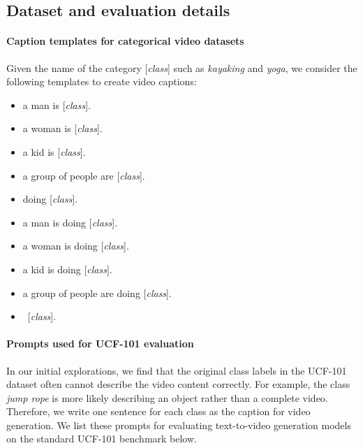 \documentclass[10pt,twocolumn,letterpaper]{article}
\begin{document}
\subsection{Dataset and evaluation details}
\label{sec:data_eval_details}

\paragraph{Caption templates for categorical video datasets} Given the name of the category [\textit{class}] such as \textit{kayaking} and \textit{yoga}, we consider the following templates to create video captions:

\begin{itemize}
    \item a man is [\textit{class}].
    \item a woman is [\textit{class}].
    \item a kid is [\textit{class}].
    \item a group of people are [\textit{class}].
    \item doing [\textit{class}].
    \item a man is doing [\textit{class}].
    \item a woman is doing [\textit{class}].
    \item a kid is doing [\textit{class}].
    \item a group of people are doing [\textit{class}].
    \item ~[\textit{class}].
\end{itemize}

\paragraph{Prompts used for UCF-101 evaluation} In our initial explorations, we find that the original class labels in the UCF-101 dataset often cannot describe the video content correctly. For example, the class \textit{jump rope} is more likely describing an object rather than a complete video. Therefore, we write one sentence for each class as the caption for video generation. We list these prompts for evaluating text-to-video generation models on the standard UCF-101 benchmark below.  
\end{document}
